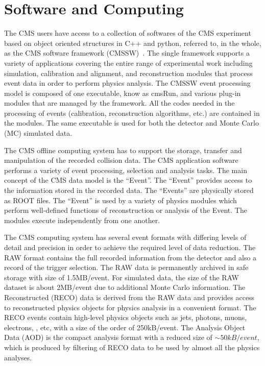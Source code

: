 \section{Software and Computing}\label{Se:Software}
The CMS users have access to a collection of softwares of the CMS experiment based on object oriented structures in C++ and python, referred to,
in the whole, as the CMS software framework (CMSSW)~\cite{cmsTDR}. The single framework supports a variety of applications covering the entire range of 
experimental work including simulation, calibration and alignment, and reconstruction modules that process event data in order to perform
physics analysis. The CMSSW event processing model is composed of one executable, know as cmsRun, and various plug-in modules that are
managed by the framework. All the codes needed in the processing of events (calibration, reconstruction algorithms, etc.) are contained
in the modules. The same executable is used for both the detector and Monte Carlo (MC) simulated data. 

The CMS offline computing system has to support the storage, transfer and manipulation of the recorded collision data. The CMS application software
performs a variety of event processing, selection and analysis tasks. The main concept of the CMS data model is the ``Event''. The ``Event'' provides
access to the information stored in the recorded data. The ``Events'' are physically stored as ROOT files. The ``Event'' is used by a variety of
 physics modules which perform well-defined functions of reconstruction or analysis of the Event. The modules execute independently from one another.

The CMS computing system has several event formats with differing levels of detail and precision in order to achieve the required level of 
data reduction. The RAW format contains the full recorded information from the detector and also a record of the trigger selection. The RAW
data is permanently archived in safe storage with size of 1.5\unit{MB/event}. For simulated data, the size of the RAW dataset is about 2\unit{MB/event}
due to additional Monte Carlo information. The Reconstructed (\gls{RECO}) data is derived from the RAW data and provides access to reconstructed physics
objects for physics analysis in a convenient format. The RECO events contain high-level physics objects such as jets, photons, muons, electrons, 
\bjets, etc, with a size of the order of 250\unit{kB/event}. The Analysis Object Data (AOD) is the compact analysis format with a reduced size of 
$\sim50\unit{kB/event}$, which is produced by filtering of RECO data to be used by almost all the physics analyses.
